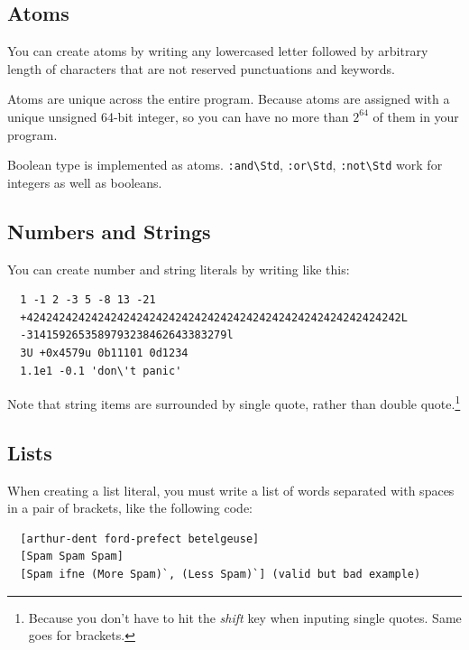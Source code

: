 \documentclass{report}
\newcommand{\mstd}[1]{\texttt{#1\textbackslash Std}}
\begin{document}
\subsection{Atoms}

You can create atoms by writing any lowercased letter followed by arbitrary length of characters that are not reserved punctuations and keywords.

Atoms are unique across the entire program. Because atoms are assigned with a unique unsigned 64-bit integer, so you can have no more than $2^{64}$ of them in your program.

\begin{mdframed}[style=detail]
  Boolean type is implemented as atoms. \mstd{:and}, \mstd{:or}, \mstd{:not} work for integers as well as booleans.
\end{mdframed}

\subsection{Numbers and Strings}

You can create number and string literals by writing like this:
\begin{mdframed}[style=example]
\begin{verbatim}
  1 -1 2 -3 5 -8 13 -21
  +4242424242424242424242424242424242424242424242424242424242L
  -3141592653589793238462643383279l
  3U +0x4579u 0b11101 0d1234
  1.1e1 -0.1 'don\'t panic'
\end{verbatim}
\end{mdframed}

Note that string items are surrounded by single quote, rather than double quote.\footnote{Because you don't have to hit the \textit{shift} key when inputing single quotes. Same goes for brackets.}

\subsection{Lists}

When creating a list literal, you must write a list of words separated with spaces in a pair of brackets, like the following code:
\begin{mdframed}[style=example]
\begin{verbatim}
  [arthur-dent ford-prefect betelgeuse]
  [Spam Spam Spam]
  [Spam ifne (More Spam)`, (Less Spam)`] (valid but bad example)
\end{verbatim}
\end{mdframed}
\end{document}
